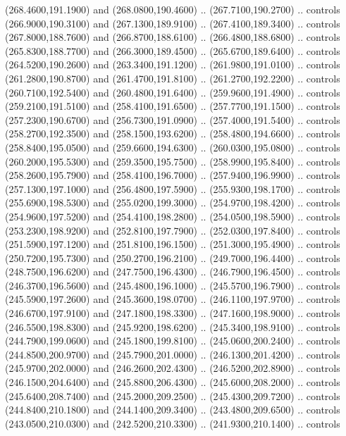 {\begin{scope}[y=0.80pt, x=0.80pt, yscale=-1, xscale=1, inner sep=0pt, outer sep=0pt, #1]
      (268.4600,191.1900) and (268.0800,190.4600) .. (267.7100,190.2700) .. controls
      (266.9000,190.3100) and (267.1300,189.9100) .. (267.4100,189.3400) .. controls
      (267.8000,188.7600) and (266.8700,188.6100) .. (266.4800,188.6800) .. controls
      (265.8300,188.7700) and (266.3000,189.4500) .. (265.6700,189.6400) .. controls
      (264.5200,190.2600) and (263.3400,191.1200) .. (261.9800,191.0100) .. controls
      (261.2800,190.8700) and (261.4700,191.8100) .. (261.2700,192.2200) .. controls
      (260.7100,192.5400) and (260.4800,191.6400) .. (259.9600,191.4900) .. controls
      (259.2100,191.5100) and (258.4100,191.6500) .. (257.7700,191.1500) .. controls
      (257.2300,190.6700) and (256.7300,191.0900) .. (257.4000,191.5400) .. controls
      (258.2700,192.3500) and (258.1500,193.6200) .. (258.4800,194.6600) .. controls
      (258.8400,195.0500) and (259.6600,194.6300) .. (260.0300,195.0800) .. controls
      (260.2000,195.5300) and (259.3500,195.7500) .. (258.9900,195.8400) .. controls
      (258.2600,195.7900) and (258.4100,196.7000) .. (257.9400,196.9900) .. controls
      (257.1300,197.1000) and (256.4800,197.5900) .. (255.9300,198.1700) .. controls
      (255.6900,198.5300) and (255.0200,199.3000) .. (254.9700,198.4200) .. controls
      (254.9600,197.5200) and (254.4100,198.2800) .. (254.0500,198.5900) .. controls
      (253.2300,198.9200) and (252.8100,197.7900) .. (252.0300,197.8400) .. controls
      (251.5900,197.1200) and (251.8100,196.1500) .. (251.3000,195.4900) .. controls
      (250.7200,195.7300) and (250.2700,196.2100) .. (249.7000,196.4400) .. controls
      (248.7500,196.6200) and (247.7500,196.4300) .. (246.7900,196.4500) .. controls
      (246.3700,196.5600) and (245.4800,196.1000) .. (245.5700,196.7900) .. controls
      (245.5900,197.2600) and (245.3600,198.0700) .. (246.1100,197.9700) .. controls
      (246.6700,197.9100) and (247.1800,198.3300) .. (247.1600,198.9000) .. controls
      (246.5500,198.8300) and (245.9200,198.6200) .. (245.3400,198.9100) .. controls
      (244.7900,199.0600) and (245.1800,199.8100) .. (245.0600,200.2400) .. controls
      (244.8500,200.9700) and (245.7900,201.0000) .. (246.1300,201.4200) .. controls
      (245.9700,202.0000) and (246.2600,202.4300) .. (246.5200,202.8900) .. controls
      (246.1500,204.6400) and (245.8800,206.4300) .. (245.6000,208.2000) .. controls
      (245.6400,208.7400) and (245.2000,209.2500) .. (245.4300,209.7200) .. controls
      (244.8400,210.1800) and (244.1400,209.3400) .. (243.4800,209.6500) .. controls
      (243.0500,210.0300) and (242.5200,210.3300) .. (241.9300,210.1400) .. controls

\end{scope}}
